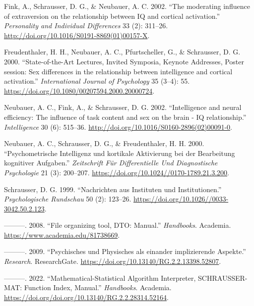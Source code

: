 \documentclass[
]{article}
\author{}
\date{}
\newlength{\cslhangindent}
\newlength{\cslentryspacingunit} %
\newenvironment{CSLReferences}[2] %
 {%
  \setlength{\parindent}{0pt}
  \ifodd #1
  \let\oldpar\par
  \def\par{\hangindent=\cslhangindent\oldpar}
  \fi
  \setlength{\parskip}{#2\cslentryspacingunit}
 }%
 {}
\begin{document}
\hypertarget{refs}{}
\begin{CSLReferences}{1}{0}
\leavevmode{}%
Fink, A., Schrausser, D. G., \& Neubauer, A. C. 2002. {``{The moderating
influence of extraversion on the relationship between IQ and cortical
activation}.''} \emph{Personality and Individual Differences} 33 (2):
311--26. \url{http://doi.org/10.1016/S0191-8869(01)00157-X}.

\leavevmode{}%
Freudenthaler, H. H., Neubauer, A. C., Pfurtscheller, G., \& Schrausser,
D. G. 2000. {``{State-of-the-Art Lectures, Invited Symposia, Keynote
Addresses, Poster session: Sex differences in the relationship between
intelligence and cortical activation}.''} \emph{International Journal of
Psychology} 35 (3--4): 55.
\url{https://doi.org/10.1080/00207594.2000.20000724}.

\leavevmode{}%
Neubauer, A. C., Fink, A., \& Schrausser, D. G. 2002. {``{Intelligence
and neural efficiency: The influence of task content and sex on the
brain - IQ relationship}.''} \emph{Intelligence} 30 (6): 515--36.
\url{http://doi.org/10.1016/S0160-2896(02)00091-0}.

\leavevmode{}%
Neubauer, A. C., Schrausser, D. G., \& Freudenthaler, H. H. 2000.
{``{Psychometrische Intelligenz und kortikale Aktivierung bei der
Bearbeitung kognitiver Aufgaben}.''} \emph{{Zeitschrift Für
Differentielle Und Diagnostische Psychologie}} 21 (3): 200--207.
\url{https://doi.org/10.1024//0170-1789.21.3.200}.

\leavevmode{}%
Schrausser, D. G. 1999. {``{Nachrichten aus Instituten und
Institutionen}.''} \emph{Psychologische Rundschau} 50 (2): 123--26.
\url{https://doi.org/10.1026//0033-3042.50.2.123}.

\leavevmode{}%
---------. 2008. {``{File organizing tool, DTO: Manual}.''}
\emph{Handbooks}. Academia. \url{https://www.academia.edu/81738669}.

\leavevmode{}%
---------. 2009. {``{Psychisches und Physisches als einander
implizierende Aspekte}.''} \emph{Research}. ResearchGate.
\url{https://doi.org/10.13140/RG.2.2.13398.52807}.

\leavevmode{}%
---------. 2022. {``{Mathematical-Statistical Algorithm Interpreter,
SCHRAUSSER-MAT: Function Index, Manual}.''} \emph{Handbooks}. Academia.
\url{https://doi.org/doi.org/10.13140/RG.2.2.28314.52164}.


\end{CSLReferences}
\end{document}
